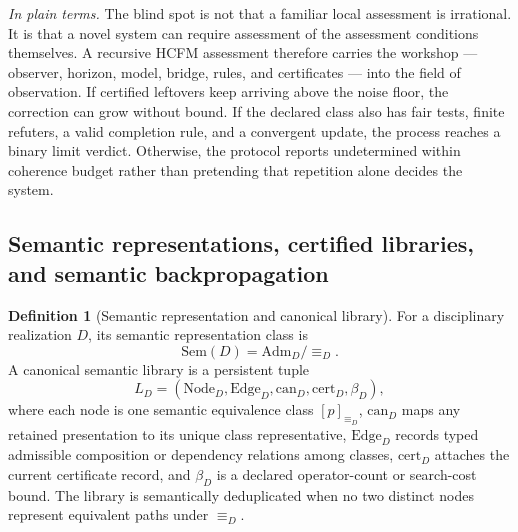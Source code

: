 \documentclass[11pt]{article}
\theoremstyle{definition}
\newtheorem{definition}{Definition}
\newcommand{\plainterms}{\emph{In plain terms.}}
\begin{document}
\noindent\plainterms{} The blind spot is not that a familiar local assessment is irrational. It is that a novel system can require assessment of the assessment conditions themselves. A recursive HCFM assessment therefore carries the workshop --- observer, horizon, model, bridge, rules, and certificates --- into the field of observation. If certified leftovers keep arriving above the noise floor, the correction can grow without bound. If the declared class also has fair tests, finite refuters, a valid completion rule, and a convergent update, the process reaches a binary limit verdict. Otherwise, the protocol reports undetermined within coherence budget rather than pretending that repetition alone decides the system.

\subsection{Semantic representations, certified libraries, and semantic backpropagation}

\begin{definition}[Semantic representation and canonical library]
For a disciplinary realization $D$, its semantic representation class is
\begin{equation}
\mathrm{Sem}(D) = \mathrm{Adm}_D / \equiv_D. \tag{S32}
\end{equation}
A canonical semantic library is a persistent tuple
\begin{equation}
L_D = (\mathrm{Node}_D, \mathrm{Edge}_D, \mathrm{can}_D, \mathrm{cert}_D, \beta_D), \tag{S33}
\end{equation}
where each node is one semantic equivalence class $[p]_{\equiv_D}$, $\mathrm{can}_D$ maps any retained presentation to its unique class representative, $\mathrm{Edge}_D$ records typed admissible composition or dependency relations among classes, $\mathrm{cert}_D$ attaches the current certificate record, and $\beta_D$ is a declared operator-count or search-cost bound. The library is semantically deduplicated when no two distinct nodes represent equivalent paths under $\equiv_D$.
\end{definition}
\end{document}
